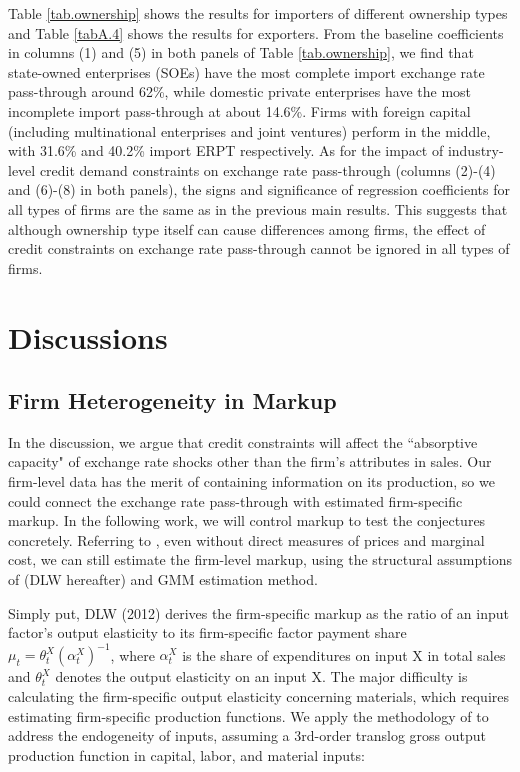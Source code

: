 \documentclass[12pt]{article}
\begin{document}
Table \ref{tab.ownership} shows the results for importers of different ownership types and Table \ref{tabA.4} shows the results for exporters. From the baseline coefficients in columns (1) and (5) in both panels of Table \ref{tab.ownership}, we find that state-owned enterprises (SOEs) have the most complete import exchange rate pass-through around 62\%, while domestic private enterprises have the most incomplete import pass-through at about 14.6\%. Firms with foreign capital (including multinational enterprises and joint ventures) perform in the middle, with 31.6\% and 40.2\% import ERPT respectively. As for the impact of industry-level credit demand constraints on exchange rate pass-through (columns (2)-(4) and (6)-(8) in both panels), the signs and significance of regression coefficients for all types of firms are the same as in the previous main results. This suggests that although ownership type itself can cause differences among firms, the effect of credit constraints on exchange rate pass-through cannot be ignored in all types of firms.

\section{Discussions} \label{Discussion}

\subsection{Firm Heterogeneity in Markup}
In the discussion, we argue that credit constraints will affect the ``absorptive capacity" of exchange rate shocks other than the firm's attributes in sales. Our firm-level data has the merit of containing information on its production, so we could connect the exchange rate pass-through with estimated firm-specific markup. In the following work, we will control markup to test the conjectures concretely. Referring to \cite{bkl2021}, even without direct measures of prices and marginal cost, we can still estimate the firm-level markup, using the structural assumptions of \cite{dlw2012} (DLW hereafter) and GMM estimation method.

Simply put, DLW (2012)\cite{dlw2012} derives the firm-specific markup as the ratio of an input factor's output elasticity to its firm-specific factor payment share $\mu_{t}=\theta_{t}^{X}\left(\alpha_{t}^{X}\right)^{-1}$, where $\alpha_{t}^{X}$ is the share of expenditures on input X in total sales and $\theta^X_t$ denotes the output elasticity on an input X. The major difficulty is calculating the firm-specific output elasticity concerning materials, which requires estimating firm-specific production functions. We apply the methodology of \cite{acf2015} to address the endogeneity of inputs, assuming a 3rd-order translog gross output production function in capital, labor, and material inputs:
\end{document}

